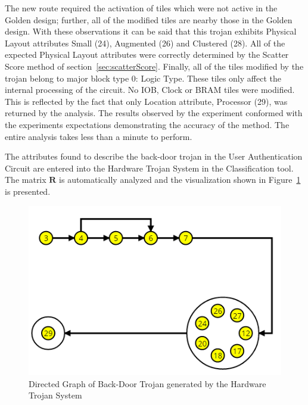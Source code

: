 \documentclass[journal, hidelinks]{IEEEtran}
\begin{document}
The new route required the activation of tiles which were not active in the Golden design; further, all of the modified tiles are nearby those in the Golden design. 
With these observations it can be said that this trojan exhibits Physical Layout attributes Small (24), Augmented (26) and Clustered (28). 
All of the expected Physical Layout attributes were correctly determined by the Scatter Score method of section~\ref{sec:scatterScore}.
Finally, all of the tiles modified by the trojan belong to major block type 0: Logic Type.
These tiles only affect the internal processing of the circuit.
No IOB, Clock or BRAM tiles were modified.
This is reflected by the fact that only Location attribute, Processor (29), was returned by the analysis.
The results observed by the experiment conformed with the experiments expectations demonstrating the accuracy of the method.
The entire analysis takes less than a minute to perform.

The attributes found to describe the back-door trojan in the User Authentication Circuit are entered into the Hardware Trojan System in the Classification tool.
The matrix $\mathbf{R}$ is automatically analyzed and the visualization shown in Figure~\ref{fig:backDoorVisual} is presented.
\begin{figure}[h]
	\centering
	\includegraphics[width=0.91\linewidth]{Figures/backDoorVisual}
	\caption[Directed Graph of Back-Door Trojan generated by the Hardware Trojan System]{Directed Graph of Back-Door Trojan generated by the Hardware Trojan System}
	\label{fig:backDoorVisual}
\end{figure}
\end{document}
